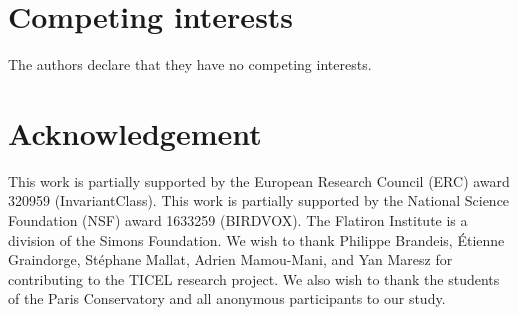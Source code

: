 \documentclass{bmcart}
\newcommand{\nmu}{}
\begin{document}
\begin{backmatter}

\section*{\nmu Competing interests}
  The authors declare that they have no competing interests.


\section*{\nmu Acknowledgement}
This work is partially supported by the European Research Council (ERC) award 320959 (InvariantClass).
This work is partially supported by the National Science Foundation (NSF) award 1633259 (BIRDVOX).
The Flatiron Institute is a division of the Simons Foundation.
We wish to thank Philippe Brandeis, \'{E}tienne Graindorge, St\'{e}phane Mallat, Adrien Mamou-Mani, and Yan Maresz for contributing to the TICEL research project.
We also wish to thank the students of the Paris Conservatory and all anonymous participants to our study.







\end{backmatter}
\end{document}
